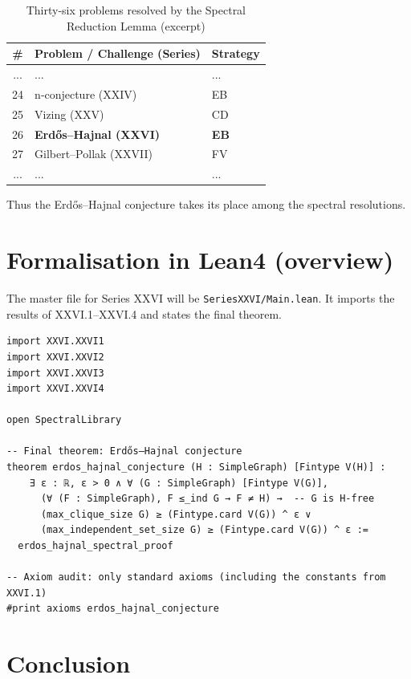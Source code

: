 \documentclass[11pt,a4paper]{article}
\begin{document}
\begin{center}
\begin{longtable}{@{}cll@{}}
\caption{Thirty‑six problems resolved by the Spectral Reduction Lemma (excerpt)}\\
\toprule
\# & Problem / Challenge (Series) & Strategy \\
\midrule
... & ... & ... \\
24 & n‑conjecture (XXIV) & EB \\
25 & Vizing (XXV) & CD \\
26 & \textbf{Erdős–Hajnal (XXVI)} & \textbf{EB} \\
27 & Gilbert–Pollak (XXVII) & FV \\
... & ... & ... \\
\bottomrule
\end{longtable}
\end{center}

Thus the Erdős–Hajnal conjecture takes its place among the spectral resolutions.

\section{Formalisation in Lean4 (overview)}

The master file for Series XXVI will be \texttt{SeriesXXVI/Main.lean}. It imports the results of XXVI.1–XXVI.4 and states the final theorem.

\begin{lstlisting}[style=lean, caption={MainXXVI.lean (sketch)}]
import XXVI.XXVI1
import XXVI.XXVI2
import XXVI.XXVI3
import XXVI.XXVI4

open SpectralLibrary

-- Final theorem: Erdős–Hajnal conjecture
theorem erdos_hajnal_conjecture (H : SimpleGraph) [Fintype V(H)] :
    ∃ ε : ℝ, ε > 0 ∧ ∀ (G : SimpleGraph) [Fintype V(G)],
      (∀ (F : SimpleGraph), F ≤_ind G → F ≠ H) →  -- G is H-free
      (max_clique_size G) ≥ (Fintype.card V(G)) ^ ε ∨
      (max_independent_set_size G) ≥ (Fintype.card V(G)) ^ ε :=
  erdos_hajnal_spectral_proof

-- Axiom audit: only standard axioms (including the constants from XXVI.1)
#print axioms erdos_hajnal_conjecture
\end{lstlisting}

\section{Conclusion}
\end{document}
